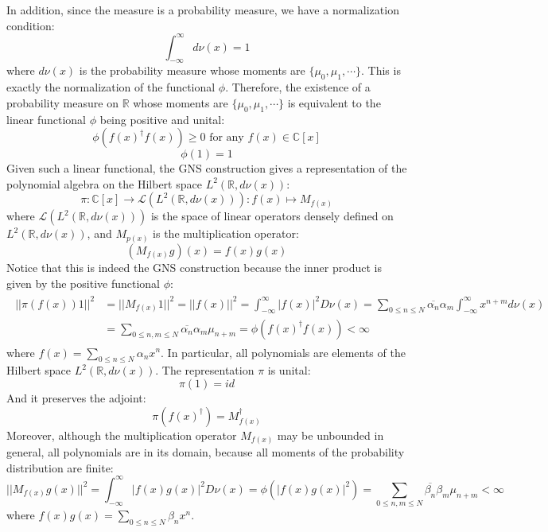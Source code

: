 \documentclass[a4paper,11pt]{article}
\theoremstyle{definition}
\numberwithin{equation}{section}
\begin{document}
In addition, since the measure is a probability measure, we have a normalization condition:
\begin{equation}
    \int_{-\infty}^\infty d\nu(x) = 1
\end{equation}
where $d\nu(x)$ is the probability measure whose moments are $\{\mu_0,\mu_1,\cdots\}$. This is exactly the normalization of the functional $\phi$. Therefore, the existence of a probability measure on $\mathbb{R}$ whose moments are $\{\mu_0,\mu_1,\cdots\}$ is equivalent to the linear functional $\phi$ being positive and unital:
\begin{equation}
    \phi(f(x)^\dagger f(x))\geq 0\text{ for any }f(x)\in\mathbb{C}[x]
\end{equation}
\begin{equation}
    \phi(1) = 1
\end{equation}
Given such a linear functional, the GNS construction gives a representation of the polynomial algebra on the Hilbert space $L^2(\mathbb{R},d\nu(x))$:
\begin{equation}
    \pi:\mathbb{C}[x]\rightarrow \mathcal{L}(L^2(\mathbb{R},d\nu(x))):f(x)\mapsto M_{f(x)}
\end{equation}
where $\mathcal{L}(L^2(\mathbb{R},d\nu(x)))$ is the space of linear operators densely defined on $L^2(\mathbb{R},d\nu(x))$, and $M_{p(x)}$ is the multiplication operator:
\begin{equation}
    (M_{f(x)}g)(x) = f(x)g(x)
\end{equation}
Notice that this is indeed the GNS construction because the inner product is given by the positive functional $\phi$:
\begin{align}
    \begin{split}
        ||\pi(f(x))1||^2 &= ||M_{f(x)}1||^2 = ||f(x)||^2 =\int_{-\infty}^\infty |f(x)|^2D\nu(x) = \sum_{0\leq n\leq N}\overline{\alpha_n}\alpha_m\int_{-\infty}^\infty x^{n+m}d\nu(x)
        \\
        &=\sum_{0\leq n,m\leq N}\overline{\alpha_n}\alpha_m\mu_{n+m} = \phi(f(x)^\dagger f(x)) < \infty
    \end{split}
\end{align}
where $f(x)=\sum_{0\leq n\leq N}\alpha_nx^n$. In particular, all polynomials are elements of the Hilbert space $L^2(\mathbb{R},d\nu(x))$. The representation $\pi$ is unital:
\begin{equation}
    \pi(1) = id
\end{equation}
And it preserves the adjoint:
\begin{equation}
    \pi(f(x)^\dagger) = M_{f(x)}^\dagger
\end{equation}
Moreover, although the multiplication operator $M_{f(x)}$ may be unbounded in general, all polynomials are in its domain, because all moments of the probability distribution are finite:
\begin{equation}
    ||M_{f(x)}g(x)||^2 = \int_{-\infty}^\infty |f(x)g(x)|^2D\nu(x) = \phi(|f(x)g(x)|^2) = \sum_{0\leq n,m\leq N}\overline{\beta_n}\beta_m\mu_{n+m} < \infty
\end{equation}
where $f(x)g(x) = \sum_{0\leq n\leq N}\beta_nx^n$. 
\end{document}
